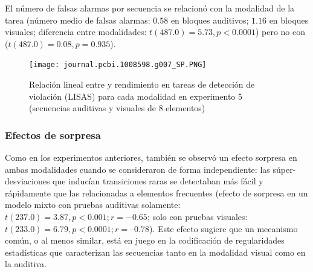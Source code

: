 El número de falsas alarmas por secuencia se relacionó con la modalidad de la tarea (número medio de falsas alarmas: $0.58$ en bloques auditivos; $1.16$ en bloques visuales; diferencia entre modalidades: $t (487.0) = 5.73, p < 0.0001$) pero no con \mdlbin ($t(487.0) = 0.08, p = 0.935$).

\begin{figure}[t!]
   \texttt{[image: journal.pcbi.1008598.g007\_SP.PNG]}
   \centering
   \caption{Relación lineal entre \mdlbin y rendimiento en tareas de detección de violación (LISAS) para cada modalidad en experimento 5 (secuencias auditivas y visuales de 8 elementos)}
   \label{PlosBIO-F7}
\end{figure}

\subsubsection*{Efectos de sorpresa}


Como en los experimentos anteriores, también se observó un efecto sorpresa en ambas modalidades cuando se consideraron de forma independiente: las súper-desviaciones que inducían transiciones raras se detectaban más fácil y rápidamente que las relacionadas a elementos frecuentes (efecto de sorpresa en un modelo mixto con pruebas auditivas solamente: $t(237.0) = 3.87, p < 0.001; r =-0.65$; solo con pruebas visuales: $t (233.0) = 6.79, p < 0.0001; r = –0.78$). Este efecto sugiere que un mecanismo común, o al menos similar, está en juego en la codificación de regularidades estadísticas que caracterizan las secuencias tanto en la modalidad visual como en la auditiva.


